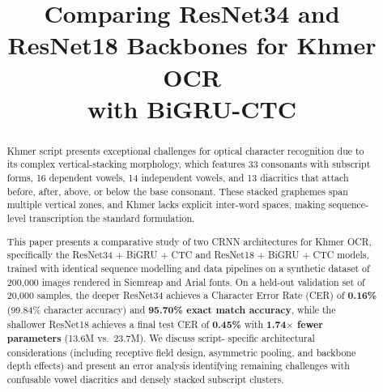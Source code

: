 \documentclass[conference]{IEEEtran}
\begin{document}
\title{Comparing ResNet34 and ResNet18 Backbones for Khmer OCR\\%
       with BiGRU-CTC}


\author{
}

\maketitle

\begin{abstract}
Khmer script presents exceptional challenges for optical character recognition due to
its complex vertical-stacking morphology, which features 33 consonants with subscript forms,
16 dependent vowels, 14 independent vowels, and 13 diacritics that attach before,
after, above, or below the base consonant. These stacked graphemes span multiple
vertical zones, and Khmer lacks explicit inter-word spaces, making sequence-level
transcription the standard formulation.

This paper presents a comparative study of two CRNN architectures for Khmer
OCR, specifically the ResNet34 + BiGRU + CTC and ResNet18 + BiGRU + CTC models, trained with
identical sequence modelling and data pipelines on a synthetic dataset of
200,000 images rendered in Siemreap and Arial fonts. On a held-out validation
set of 20,000 samples, the deeper ResNet34 achieves a Character Error Rate
(CER) of \textbf{0.16\%} (99.84\% character accuracy) and \textbf{95.70\% exact
match accuracy}, while the shallower ResNet18 achieves a final test CER of
\textbf{0.45\%} with \textbf{1.74$\times$ fewer parameters} (13.6M vs.\ 23.7M).
We discuss script-
specific architectural considerations (including receptive field design,
asymmetric pooling, and backbone depth effects) and present an error analysis
identifying remaining challenges with confusable vowel diacritics and densely
stacked subscript clusters.
\end{abstract}
\end{document}
